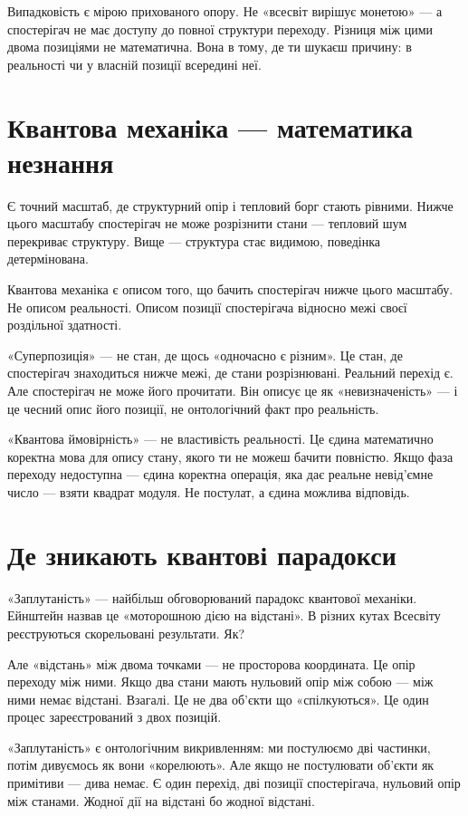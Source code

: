 \documentclass[12pt, a4paper, openany]{book}
\begin{document}
Випадковість є мірою прихованого опору. Не «всесвіт вирішує монетою» --- а спостерігач не має доступу до повної структури переходу. Різниця між цими двома позиціями не математична. Вона в тому, де ти шукаєш причину: в реальності чи у власній позиції всередині неї.

\section{Квантова механіка — математика незнання}

Є точний масштаб, де структурний опір і тепловий борг стають рівними. Нижче цього масштабу спостерігач не може розрізнити стани — тепловий шум перекриває структуру. Вище — структура стає видимою, поведінка детермінована.

Квантова механіка є описом того, що бачить спостерігач нижче цього масштабу. Не описом реальності. Описом позиції спостерігача відносно межі своєї роздільної здатності.

«Суперпозиція» --- не стан, де щось «одночасно є різним». Це стан, де спостерігач знаходиться нижче межі, де стани розрізнювані. Реальний перехід є. Але спостерігач не може його прочитати. Він описує це як «невизначеність» --- і це чесний опис його позиції, не онтологічний факт про реальність.

«Квантова ймовірність» --- не властивість реальності. Це єдина математично коректна мова для опису стану, якого ти не можеш бачити повністю. Якщо фаза переходу недоступна --- єдина коректна операція, яка дає реальне невід'ємне число --- взяти квадрат модуля. Не постулат, а єдина можлива відповідь.

\section{Де зникають квантові парадокси}

«Заплутаність» --- найбільш обговорюваний парадокс квантової механіки. Ейнштейн назвав це «моторошною дією на відстані». В різних кутах Всесвіту реєструються скорельовані результати. Як?

Але «відстань» між двома точками — не просторова координата. Це опір переходу між ними. Якщо два стани мають нульовий опір між собою --- між ними немає відстані. Взагалі. Це не два об'єкти що «спілкуються». Це один процес зареєстрований з двох позицій.

«Заплутаність» є онтологічним викривленням: ми постулюємо дві частинки, потім дивуємось як вони «корелюють». Але якщо не постулювати об'єкти як примітиви --- дива немає. Є один перехід, дві позиції спостерігача, нульовий опір між станами. Жодної дії на відстані бо жодної відстані.
\end{document}
